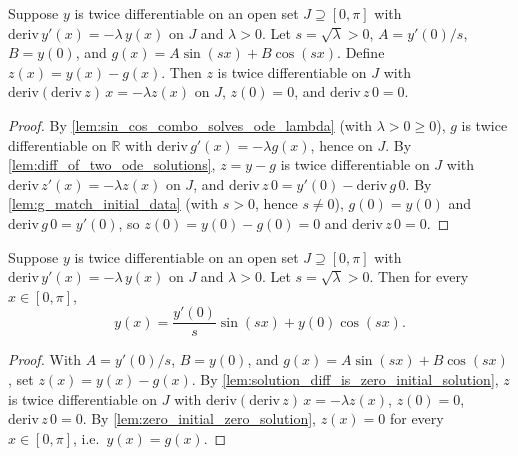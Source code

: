 \begin{lemma}
    \label{lem:solution_diff_is_zero_initial_solution}
    \leanok
    Suppose $y$ is twice differentiable on an open set $J \supseteq [0,\pi]$
    with $\mathrm{deriv}\, y'(x) = -\lambda \, y(x)$ on $J$ and $\lambda > 0$.
    Let $s = \sqrt{\lambda} > 0$, $A = y'(0)/s$, $B = y(0)$, and
    $g(x) = A \sin(sx) + B \cos(sx)$. Define $z(x) = y(x) - g(x)$. Then $z$ is
    twice differentiable on $J$ with $\mathrm{deriv}(\mathrm{deriv}\, z)\, x
    = -\lambda z(x)$ on $J$, $z(0) = 0$, and $\mathrm{deriv}\, z\, 0 = 0$.
\end{lemma}
\begin{proof}
    By \cref{lem:sin_cos_combo_solves_ode_lambda} (with $\lambda > 0 \ge 0$),
    $g$ is twice differentiable on $\mathbb{R}$ with $\mathrm{deriv}\, g'(x) =
    -\lambda g(x)$, hence on $J$. By \cref{lem:diff_of_two_ode_solutions},
    $z = y - g$ is twice differentiable on $J$ with $\mathrm{deriv}\, z'(x) =
    -\lambda z(x)$ on $J$, and $\mathrm{deriv}\, z\, 0 = y'(0) -
    \mathrm{deriv}\, g\, 0$. By \cref{lem:g_match_initial_data} (with $s > 0$,
    hence $s \neq 0$), $g(0) = y(0)$ and $\mathrm{deriv}\, g\, 0 = y'(0)$, so
    $z(0) = y(0) - g(0) = 0$ and $\mathrm{deriv}\, z\, 0 = 0$.
\end{proof}

\begin{lemma}
    \label{lem:solution_explicit}
    \leanok
    Suppose $y$ is twice differentiable on an open set $J \supseteq [0,\pi]$
    with $\mathrm{deriv}\, y'(x) = -\lambda \, y(x)$ on $J$ and $\lambda > 0$. Let
    $s = \sqrt{\lambda} > 0$. Then for every $x \in [0,\pi]$,
    \[ y(x) = \frac{y'(0)}{s} \sin(sx) + y(0) \cos(sx). \]
\end{lemma}
\begin{proof}
    With $A = y'(0)/s$, $B = y(0)$, and $g(x) = A \sin(sx) + B \cos(sx)$, set
    $z(x) = y(x) - g(x)$. By
    \cref{lem:solution_diff_is_zero_initial_solution}, $z$ is twice
    differentiable on $J$ with $\mathrm{deriv}(\mathrm{deriv}\, z)\, x =
    -\lambda z(x)$, $z(0) = 0$, $\mathrm{deriv}\, z\, 0 = 0$. By
    \cref{lem:zero_initial_zero_solution}, $z(x) = 0$ for every
    $x \in [0,\pi]$, i.e.\ $y(x) = g(x)$.
\end{proof}

